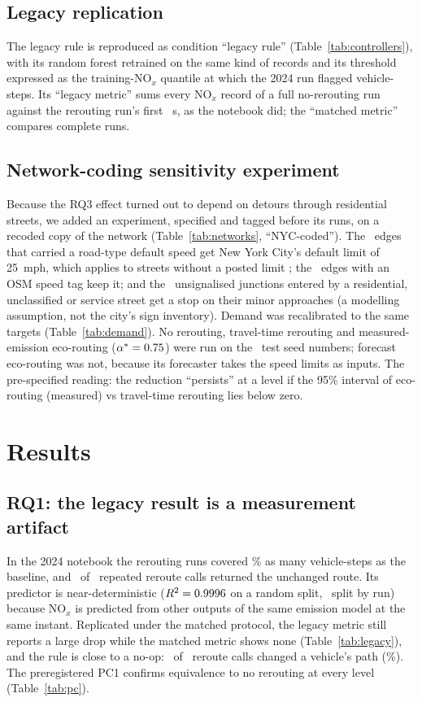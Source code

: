 \documentclass[11pt]{article}
\begin{document}
\subsection{Legacy replication}
The legacy rule is reproduced as condition ``legacy rule'' (Table~\ref{tab:controllers}), with its random forest
retrained on the same kind of records and its threshold expressed as the training-NO$_x$ quantile at which the 2024
run flagged vehicle-steps. Its ``legacy metric'' sums every NO$_x$ record of a full no-rerouting run against the
rerouting run's first \LegacyControlledSteps~s, as the notebook did; the ``matched metric'' compares complete runs.

\subsection{Network-coding sensitivity experiment}\label{sec:sensdesign}
Because the RQ3 effect turned out to depend on detours through residential streets, we added an experiment,
specified and tagged before its runs, on a recoded copy of the network (Table~\ref{tab:networks}, ``NYC-coded''). The
\SensEdgesSpeedChanged\ edges that carried a road-type default speed get New York City's default limit of 25~mph,
which applies to streets without a posted limit \citep{nycdot2014speed}; the \SensEdgesTagged\ edges with an OSM
speed tag keep it; and the \SensJunctionsStop\ unsignalised junctions entered by a residential, unclassified or
service street get a stop on their minor approaches (a modelling assumption, not the city's sign inventory). Demand
was recalibrated to the same targets (Table~\ref{tab:demand}). No rerouting, travel-time rerouting and
measured-emission eco-routing ($\alpha^* = 0.75$) were run on the \ConfirmatoryN\ test seed numbers;
forecast eco-routing was not, because its forecaster takes the speed limits as inputs. The pre-specified reading:
the reduction ``persists'' at a level if the 95\% interval of eco-routing (measured) vs travel-time rerouting lies
below zero.

\section{Results}\label{sec:results}
\subsection{RQ1: the legacy result is a measurement artifact}
In the 2024 notebook the rerouting runs covered \LegacyRowRatioRF\% as many vehicle-steps as the baseline, and
\LegacyRepeatUnchanged\ of \LegacyRepeatCalls\ repeated reroute calls returned the unchanged route. Its predictor is
near-deterministic ($R^2 = 0.9996$ on a random split, \LegacyRFRunSplitRTwo\ split by run) because NO$_x$ is
predicted from other outputs of the same emission model at the same instant. Replicated under the matched protocol,
the legacy metric still reports a large drop while the matched metric shows none (Table~\ref{tab:legacy}), and the
rule is close to a no-op: \LegacyRecountChanges\ of \LegacyRecountCalls\ reroute calls changed a vehicle's path
(\LegacyRecountRate\%). The preregistered PC1 confirms equivalence to no rerouting at every level
(Table~\ref{tab:pc}).
\end{document}
